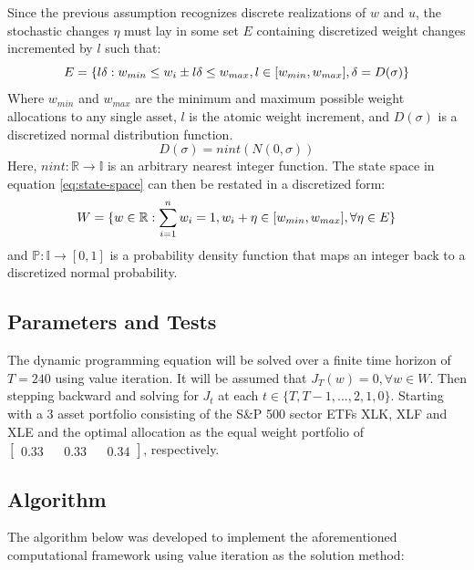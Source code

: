 \documentclass{article}
\begin{document}
Since the previous assumption recognizes discrete realizations of $w$ and $u$, the stochastic changes $\eta$ must lay in some set $E$ containing discretized weight changes incremented by $l$ such that: 
\begin{equation}
 E = \{l\delta : w_{min} \leq w_i \pm l\delta \leq w_{max}, l \in [w_{min}, w_{max}], \delta = D(\sigma)  \}
\end{equation}
Where $w_{min}$ and $w_{max}$ are the minimum and maximum possible weight allocations to any single asset, $l$ is the atomic weight increment, and $D(\sigma )$ is a discretized normal distribution function.
\begin{equation}
 D(\sigma) = nint(N(0, \sigma)) \label{eq:normal-discretized}
\end{equation}
Here, $nint: \mathbb{R} \to \mathbb{I}$ is an arbitrary nearest integer function. The state space in equation \ref{eq:state-space} can then be restated in a discretized form:
\begin{equation}
W = \{w \in \mathbb{R} : \sum_{i = 1}^{n} w_i = 1,  w_i + \eta \in [w_{min}, w_{max}], \forall \eta \in E \} \label{eq:state-space2}
\end{equation}
and $\mathbb{P}: \mathbb{I} \to [0, 1]$ is a probability density function that maps an integer back to a discretized normal probability. 

\subsection{Parameters and Tests}

The dynamic programming equation will be solved over a finite time horizon of $T = 240$ using value iteration. It will be assumed that $J_T(w) = 0, \forall w \in W$. Then stepping backward and solving for $J_t$ at each $t \in \{T, T-1, ..., 2, 1, 0\}$. Starting with a 3 asset portfolio consisting of the S\&P 500 sector ETFs XLK,  XLF and XLE and the optimal allocation as the equal weight portfolio of $\begin{bmatrix} 0.33 && 0.33 && 0.34 \end{bmatrix}$, respectively. 

\subsection{Algorithm}

The algorithm below was developed to implement the aforementioned computational framework using value iteration as the solution method:
\end{document}
